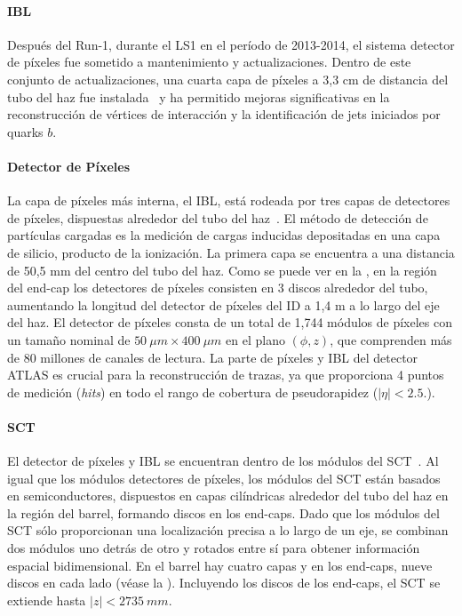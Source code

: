 \paragraph{\acf{IBL}}
Después del Run-1, durante el \ac{LS1} en el per\'iodo de 2013-2014, el sistema detector de píxeles fue sometido a mantenimiento y actualizaciones. Dentro de este conjunto de actualizaciones, una cuarta capa de píxeles a 3,3 cm de distancia del tubo del haz fue instalada~\cite{ATLAS-IBL-TDR,ATLAS-IBL-proceedings} y ha permitido mejoras significativas en la reconstrucción de vértices de interacción y la identificación de jets iniciados por quarks \(b\).


\paragraph{Detector de P\'ixeles}
La capa de píxeles más interna, el \ac{IBL}, está rodeada por tres capas de detectores de píxeles, dispuestas alrededor del tubo del haz~\cite{ATLAS-Pixel-DesignPerformance,ATLAS-Pixel-Performance-Proceedings}. El método de detección de partículas cargadas es la medición de cargas inducidas depositadas en una capa de silicio, producto de la ionización. La primera capa se encuentra a una distancia de 50,5 mm del centro del tubo del haz. Como se puede ver en la \Fig{\ref{fig:atlas:atlas:atlas_inner_detector:general}}, en la regi\'on del end-cap los detectores de píxeles consisten en 3 discos alrededor del tubo, aumentando la longitud del detector de píxeles del \ac{ID} a 1,4 m a lo largo del eje del haz. El detector de píxeles consta de un total de 1,744 módulos de píxeles con un tamaño nominal de $50 ~\mu m \times 400 ~\mu m$ en el plano $(\phi, z)$, que comprenden más de 80 millones de canales de lectura.  
La parte de píxeles y \ac{IBL} del detector \ac{ATLAS} es crucial para la reconstrucci\'on de trazas, ya que proporciona 4 puntos de medici\'on (\textit{hits}) en todo el rango de cobertura de pseudorapidez ($|\eta| < 2.5.$).  

\paragraph{\acf{SCT}}
El detector de píxeles y \ac{IBL} se encuentran dentro de los módulos del \ac{SCT}~\cite{ATLAS-SCT}.  
Al igual que los módulos detectores de píxeles, los módulos del \ac{SCT} están basados en semiconductores, dispuestos en capas cilíndricas alrededor del tubo del haz en la región del barrel, formando discos en los end-caps. Dado que los módulos del \ac{SCT} sólo proporcionan una localización precisa a lo largo de un eje, se combinan dos módulos uno detrás de otro y rotados entre sí para obtener información espacial bidimensional. En el barrel hay cuatro capas y en los end-caps, nueve discos en cada lado (véase la \Fig{\ref{fig:atlas:atlas:atlas_inner_detector:general}}). Incluyendo los discos de los end-caps, el \ac{SCT} se extiende hasta $|z| < 2735~mm$.

